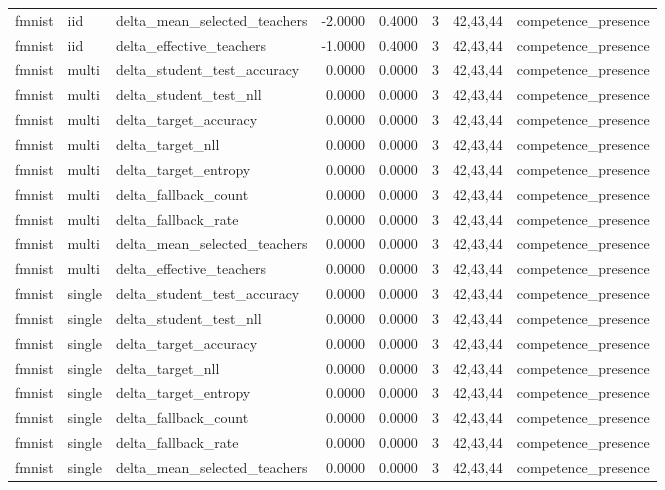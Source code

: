 \begin{tabular}{lllrrrll}
fmnist & iid & delta\_mean\_selected\_teachers & -2.0000 & 0.4000 & 3 & 42,43,44 & competence\_presence \\
fmnist & iid & delta\_effective\_teachers & -1.0000 & 0.4000 & 3 & 42,43,44 & competence\_presence \\
fmnist & multi & delta\_student\_test\_accuracy & 0.0000 & 0.0000 & 3 & 42,43,44 & competence\_presence \\
fmnist & multi & delta\_student\_test\_nll & 0.0000 & 0.0000 & 3 & 42,43,44 & competence\_presence \\
fmnist & multi & delta\_target\_accuracy & 0.0000 & 0.0000 & 3 & 42,43,44 & competence\_presence \\
fmnist & multi & delta\_target\_nll & 0.0000 & 0.0000 & 3 & 42,43,44 & competence\_presence \\
fmnist & multi & delta\_target\_entropy & 0.0000 & 0.0000 & 3 & 42,43,44 & competence\_presence \\
fmnist & multi & delta\_fallback\_count & 0.0000 & 0.0000 & 3 & 42,43,44 & competence\_presence \\
fmnist & multi & delta\_fallback\_rate & 0.0000 & 0.0000 & 3 & 42,43,44 & competence\_presence \\
fmnist & multi & delta\_mean\_selected\_teachers & 0.0000 & 0.0000 & 3 & 42,43,44 & competence\_presence \\
fmnist & multi & delta\_effective\_teachers & 0.0000 & 0.0000 & 3 & 42,43,44 & competence\_presence \\
fmnist & single & delta\_student\_test\_accuracy & 0.0000 & 0.0000 & 3 & 42,43,44 & competence\_presence \\
fmnist & single & delta\_student\_test\_nll & 0.0000 & 0.0000 & 3 & 42,43,44 & competence\_presence \\
fmnist & single & delta\_target\_accuracy & 0.0000 & 0.0000 & 3 & 42,43,44 & competence\_presence \\
fmnist & single & delta\_target\_nll & 0.0000 & 0.0000 & 3 & 42,43,44 & competence\_presence \\
fmnist & single & delta\_target\_entropy & 0.0000 & 0.0000 & 3 & 42,43,44 & competence\_presence \\
fmnist & single & delta\_fallback\_count & 0.0000 & 0.0000 & 3 & 42,43,44 & competence\_presence \\
fmnist & single & delta\_fallback\_rate & 0.0000 & 0.0000 & 3 & 42,43,44 & competence\_presence \\
fmnist & single & delta\_mean\_selected\_teachers & 0.0000 & 0.0000 & 3 & 42,43,44 & competence\_presence \\

\end{tabular}
